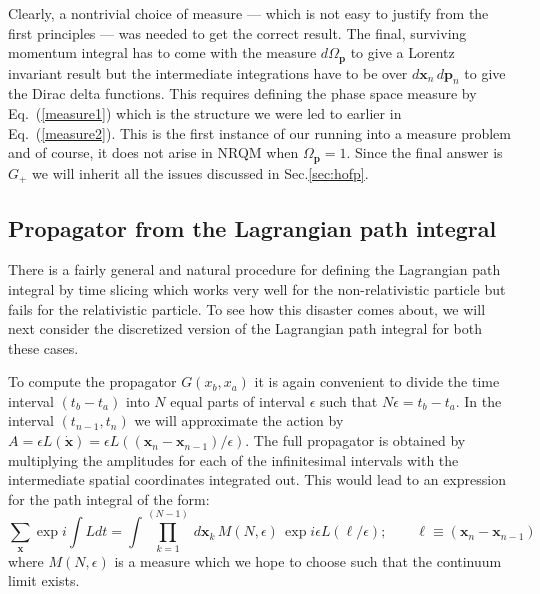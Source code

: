 \documentclass[12pt]{article}
\def\eq#1{{Eq.~(\ref{#1})}}
\begin{document}
Clearly, a nontrivial choice of measure --- which is not easy to justify from the first principles --- was needed to get the correct result. The final, surviving momentum integral has to come with the measure $d\Omega_{\bm{p}}$ to give a Lorentz invariant result but the intermediate integrations have to be over $d\bm{x}_n \, d\bm{p}_n$ to give the Dirac delta functions. This requires defining the phase space measure by
\eq{measure1} which is the structure we were led to earlier in \eq{measure2}. This is the first instance of our running into a measure problem and of course, it does not arise in NRQM when $\Omega_{\bm{p}}=1$. Since the final answer is $G_+$ we will inherit all the issues discussed in Sec.\ref{sec:hofp}.





\subsection{Propagator from  the Lagrangian path integral}\label{sec:lpi}

There is a fairly general and natural procedure for defining the Lagrangian path integral by time slicing which works very well for the non-relativistic particle but fails for the relativistic particle. To see how this disaster comes about, we will next consider the discretized version of the Lagrangian path integral for both these cases.

To compute the propagator $G(x_b,x_a)$ it is again convenient to divide the time interval $(t_b - t_a)$ into $N$ equal parts of interval $\epsilon$ such that $N\epsilon = t_b - t_a$. In the interval $(t_{n-1},t_n)$ we will approximate the action by $A=\epsilon L(\dot{\bm{x}}) = \epsilon L\left((\bm{x}_n - \bm{x}_{n-1})/\epsilon\right)$. The full propagator is obtained by multiplying the amplitudes for each of the infinitesimal intervals with the intermediate spatial coordinates integrated out. 
 This would lead to an expression for the path integral of the form:
\begin{equation}
\sum_{\bm{x}} \exp i\int L dt = \int \prod_{k=1}^{(N-1)} \, d\bm{x}_k\, M(N,\epsilon) \, \exp i\epsilon L(\bm{\ell}/\epsilon);
\qquad\bm{\ell}\equiv(\bm{x}_n - \bm{x}_{n-1})
\label{disc1}
\end{equation}
where $M(N, \epsilon)$ is a measure which we hope to choose such that the continuum limit exists.
\end{document}
